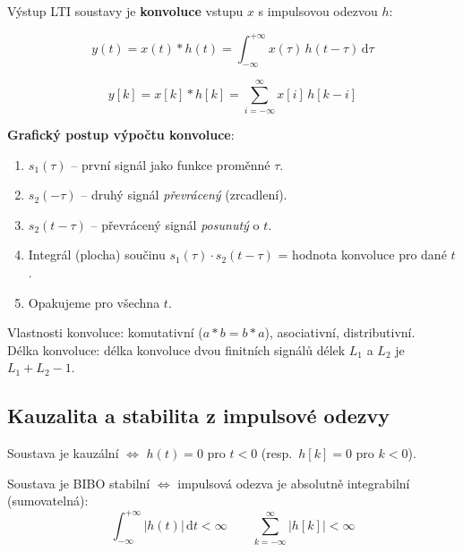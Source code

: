 \documentclass[12pt,a4paper]{article}
\newcommand{\dd}{\mathrm{d}}
\begin{document}
Výstup LTI soustavy je \textbf{konvoluce} vstupu $x$ s impulsovou odezvou $h$:

\begin{matBox}
\[
  y(t) = x(t) * h(t) = \int_{-\infty}^{+\infty} x(\tau)\,h(t-\tau)\,\dd\tau
\]
\end{matBox}

\begin{matBox}
\[
  y[k] = x[k] * h[k] = \sum_{i=-\infty}^{\infty} x[i]\,h[k-i]
\]
\end{matBox}

\textbf{Grafický postup výpočtu konvoluce}:
\begin{enumerate}
  \item $s_1(\tau)$ – první signál jako funkce proměnné $\tau$.
  \item $s_2(-\tau)$ – druhý signál \emph{převrácený} (zrcadlení).
  \item $s_2(t-\tau)$ – převrácený signál \emph{posunutý} o $t$.
  \item Integrál (plocha) součinu $s_1(\tau)\cdot s_2(t-\tau)$ = hodnota konvoluce pro dané $t$.
  \item Opakujeme pro všechna $t$.
\end{enumerate}

Vlastnosti konvoluce: komutativní ($a*b = b*a$), asociativní, distributivní.\\
Délka konvoluce: délka konvoluce dvou finitních signálů délek $L_1$ a $L_2$ je $L_1 + L_2 - 1$.

\begin{hvezdBox}
\subsection*{Kauzalita a stabilita z impulsové odezvy}
\end{hvezdBox}

\begin{infoBox}[Kauzalita]
Soustava je kauzální $\Leftrightarrow$ $h(t) = 0$ pro $t < 0$ (resp.\ $h[k] = 0$ pro $k < 0$).
\end{infoBox}

\begin{infoBox}
Soustava je BIBO stabilní $\Leftrightarrow$ impulsová odezva je absolutně integrabilní (sumovatelná):
\[
  \int_{-\infty}^{+\infty} |h(t)|\,\dd t < \infty
  \qquad
  \sum_{k=-\infty}^{\infty} |h[k]| < \infty
\]
\end{infoBox}
\end{document}
